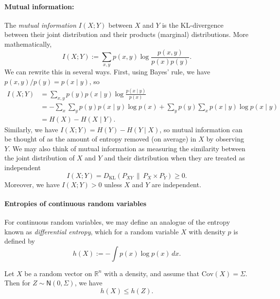 \paragraph{Mutual information:} The \emph{mutual information $I(X;Y)$} between $X$ and $Y$ is the KL-divergence between their joint distribution and their products (marginal) distributions. More mathematically,
\begin{equation}
    I(X;Y) := \sum_{x,y} p(x,y) \log \frac{p(x,y)}{p(x)p(y)}.
\end{equation}
We can rewrite this in several ways. First, using Bayes' rule, we have $p(x,y)/p(y) = p(x \mid y)$, so
\begin{align*}
    I(X;Y) &= \sum_{x,y} p(y) p(x \mid y) \log \frac{p(x \mid y)}{p(x)} \\
    &= -\sum_{x} \sum_{y} p(y) p(x \mid y) \log p(x) + \sum_{y} p(y) \sum_{x} p(x \mid y) \log p(x \mid y) \\
    &= H(X) - H(X \mid Y).
\end{align*}
Similarly, we have $I(X;Y) = H(Y) - H(Y \mid X)$, so mutual information can be thought of as the amount of entropy removed (on average) in $X$ by observing $Y$. We may also think of mutual information as measuring the similarity between the joint distribution of $X$ and $Y$ and their distribution when they are treated as independent
\begin{equation*}
    I(X;Y) = D_{\mathrm{KL}}\left(P_{XY} \,\|\, P_X \times P_Y\right) \geq 0.
\end{equation*}
Moreover, we have $I(X;Y) > 0$ unless $X$ and $Y$ are independent.

\paragraph{Entropies of continuous random variables} For continuous random variables, we may define an analogue of the entropy known as \emph{differential entropy}, which for a random variable $X$ with density $p$ is defined by
\begin{equation}
    h(X) := -\int p(x) \log p(x) \, dx.
\end{equation}

\begin{prop}
    Let $X$ be a random vector on $\mathbb{R}^n$ with a density, and assume that $\mathrm{Cov}(X) = \Sigma$. Then for $Z \sim \mathsf{N}(0, \Sigma)$, we have
    \begin{equation*}
        h(X) \leq h(Z).
    \end{equation*}
\end{prop}


